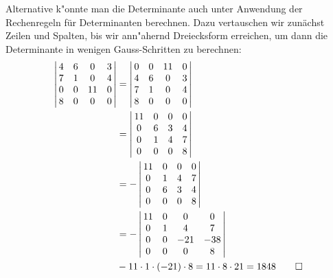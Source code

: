 \begin{loesung}
Alternative k"onnte man die Determinante auch unter Anwendung der
Rechenregeln f\"ur Determinanten berechnen. Dazu vertauschen wir
zun\"achst Zeilen und Spalten, bis wir ann"ahernd Dreiecksform erreichen,
um dann die Determinante in wenigen Gauss-Schritten zu berechnen:
\begin{align*}
\left|\,\begin{matrix}
4&6& 0&3\\
7&1& 0&4\\
0&0&11&0\\
8&0& 0&0
\end{matrix}\,\right|
&=
\left|\,\begin{matrix}
0&0&11&0\\
4&6& 0&3\\
7&1& 0&4\\
8&0& 0&0
\end{matrix}\,\right|
\\
&=
\left|\,\begin{matrix}
11&0&0&0\\
 0&6&3&4\\
 0&1&4&7\\
 0&0&0&8
\end{matrix}\,\right|\\
&=
-\left|\,\begin{matrix}
11&0&0&0\\
 0&1&4&7\\
 0&6&3&4\\
 0&0&0&8
\end{matrix}\,\right|\\
&=
-\left|\,\begin{matrix}
11&0&  0&  0\\
 0&1&  4&  7\\
 0&0&-21&-38\\
 0&0&  0&  8
\end{matrix}\,\right|\\
&-11\cdot 1\cdot (-21)\cdot 8=11\cdot 8\cdot 21=1848
\qedhere
\end{align*}
\end{loesung}
